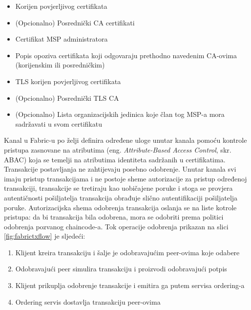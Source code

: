 \documentclass[times, utf8, diplomski]{fer}
\begin{document}
\begin{itemize}

\item Korijen povjerljivog certifikata

\item (Opcionalno) Posrednički CA certifikati

\item Certifikat MSP administratora

\item Popis opoziva certifikata koji odgovaraju prethodno navedenim CA-ovima (korijenskim ili posredničkim)

\item TLS korijen povjerljivog certifikata

\item (Opcionalno) Posrednički TLS CA

\item (Opcionalno) Lista organizacijskih jedinica koje član tog MSP-a mora sadržavati u svom certifikatu

\end{itemize}

Kanal u Fabric-u po želji definira određene uloge unutar kanala pomoću kontrole pristupa zasnovane na atributima (eng. \textit{Attribute-Based Access Control}, skr. ABAC) koja se temelji na atributima identiteta sadržanih u certifikatima. Transakcije postavljanja ne zahtijevaju posebno odobrenje. Unutar kanala svi imaju pristup transakcijama i ne postoje sheme autorizacije za pristup određenoj transakciji, transakcije se tretiraju kao uobičajene poruke i stoga se provjera autentičnosti pošiljatelja transakcija obrađuje slično autentifikaciji pošiljatelja poruke. Autorizacijska shema odobrenja transakcija oslanja se na liste kotrole pristupa: da bi transakcija bila odobrena, mora se odobriti prema politici odobrenja pozvanog chaincode-a. Tok operacije odobrenja prikazan na slici \ref{fig:fabrictxflow} je sljedeći:

\begin{enumerate}

\item Klijent kreira transakciju i šalje je odobravajućim peer-ovima koje odabere

\item Odobravajući peer simulira transakciju i proizvodi odobravajući potpis

\item Klijent prikuplja odobrenje transakcije i emitira ga putem servisa ordering-a

\item Ordering servis dostavlja transakciju peer-ovima

\end{enumerate}
\end{document}
